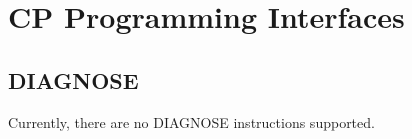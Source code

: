 \chapter{CP Programming Interfaces}
\label{chap:prog}
\cbstart \section{DIAGNOSE} \cbend
Currently, there are no \cbstart DIAGNOSE \cbend instructions supported.

